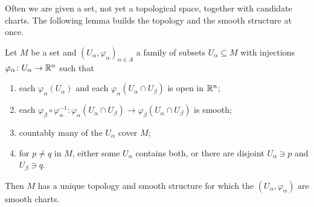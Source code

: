 Often we are given a set, not yet a topological space, together with candidate charts. The following lemma builds the topology and the smooth structure at once.

\begin{lemma}\label{smooth-manifolds:lemma-chart-lemma}
Let $M$ be a set and $(U_\alpha, \varphi_\alpha)_{\alpha \in A}$ a family of subsets $U_\alpha \subseteq M$ with injections $\varphi_\alpha \colon U_\alpha \to \mathbb{R}^n$ such that
\begin{enumerate}
\item each $\varphi_\alpha(U_\alpha)$ and each $\varphi_\alpha(U_\alpha \cap U_\beta)$ is open in $\mathbb{R}^n$;
\item each $\varphi_\beta \circ \varphi_\alpha^{-1} \colon \varphi_\alpha(U_\alpha \cap U_\beta) \to \varphi_\beta(U_\alpha \cap U_\beta)$ is smooth;
\item countably many of the $U_\alpha$ cover $M$;
\item for $p \neq q$ in $M$, either some $U_\alpha$ contains both, or there are disjoint $U_\alpha \ni p$ and $U_\beta \ni q$.
\end{enumerate}
Then $M$ has a unique topology and smooth structure for which the $(U_\alpha, \varphi_\alpha)$ are smooth charts.
\end{lemma}

